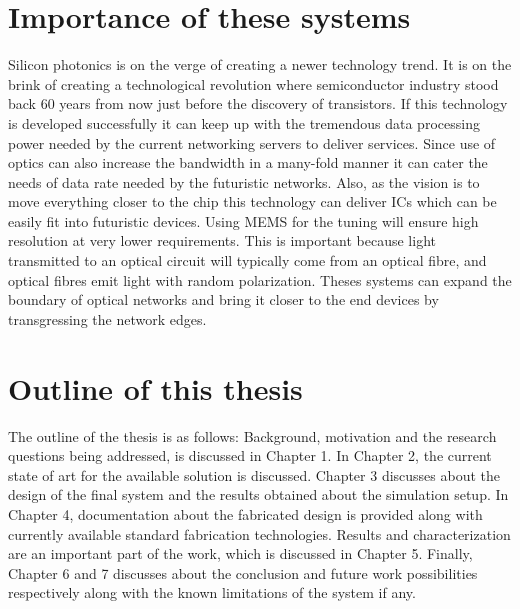 \documentclass[../main.tex]{subfiles}
\begin{document}
	\section{Importance of these systems}
Silicon photonics is on the verge of creating a newer technology trend. It is on the brink of creating a technological revolution where semiconductor industry stood back 60 years from now just before the discovery of transistors. If this technology is developed successfully it can keep up with the tremendous data processing power needed by the current networking servers to deliver services. Since use of optics can also increase the bandwidth in a many-fold manner it can cater the needs of data rate needed by the futuristic networks. Also, as the vision is to move everything closer to the chip this technology can deliver ICs which can be easily fit into futuristic devices. Using MEMS for the tuning will ensure high resolution at very lower requirements. This is important because light transmitted to an optical circuit will typically come from an optical fibre, and optical fibres emit light with random polarization. Theses systems can expand the boundary of optical networks and bring it closer to the end devices by transgressing the network edges.
	
	\section{Outline of this thesis}
The outline of the thesis is as follows: Background, motivation and the research
questions being addressed, is discussed in Chapter 1. In Chapter 2, the current state of art for the available solution is discussed. Chapter 3 discusses about the design of the final system and the results obtained about the simulation setup. In Chapter 4, documentation about the fabricated design is provided along with currently available standard fabrication technologies. Results and characterization are an important part of the work, which is discussed in Chapter 5. Finally, Chapter 6 and 7 discusses about the conclusion and future work possibilities respectively along with the known limitations of the system if any.  
	
\end{document}
